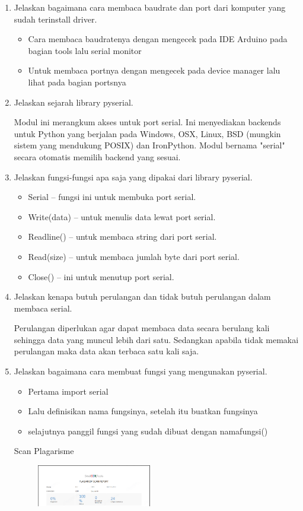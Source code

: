 \begin{enumerate}
    \item Jelaskan bagaimana cara membaca baudrate dan port dari komputer yang sudah terinstall driver.
    \begin{itemize}
        \item Cara membaca baudratenya dengan mengecek pada IDE Arduino pada bagian tools lalu serial monitor
        \item Untuk membaca portnya dengan mengecek pada device manager lalu lihat pada bagian portsnya
    \end{itemize}
    
    \item Jelaskan sejarah library pyserial.
    \par Modul ini merangkum akses untuk port serial. Ini menyediakan backends untuk Python yang berjalan pada Windows, OSX, Linux, BSD (mungkin sistem yang mendukung POSIX) dan IronPython. Modul bernama "serial" secara otomatis memilih backend yang sesuai.
    
    \item Jelaskan fungsi-fungsi apa saja yang dipakai dari library pyserial.
    \begin{itemize}
        \item Serial – fungsi ini untuk membuka port serial.
        \item Write(data) – untuk menulis data lewat port serial.
        \item Readline() – untuk membaca string dari port serial.
        \item Read(size) – untuk membaca jumlah byte dari port serial.
        \item Close() – ini untuk menutup port serial.
    \end{itemize}
    
    \item Jelaskan kenapa butuh perulangan dan tidak butuh perulangan dalam membaca serial.
    \par Perulangan diperlukan agar dapat membaca data secara berulang kali sehingga data yang muncul lebih dari satu. Sedangkan apabila tidak memakai perulangan maka data akan terbaca satu kali saja.
    
    \item Jelaskan bagaimana cara membuat fungsi yang mengunakan pyserial.
    \begin{itemize}
        \item Pertama import serial
        \item Lalu definisikan nama fungsinya, setelah itu buatkan fungsinya
        \item selajutnya panggil fungsi yang sudah dibuat dengan namafungsi()
    \end{itemize}
    
\par Scan Plagarisme
\begin{figure}[!h]	
    \includegraphics[width=5cm]{figures/5/1174077/teori/plagarismechap5.png}
    \centering
\end{figure}
\end{enumerate}
